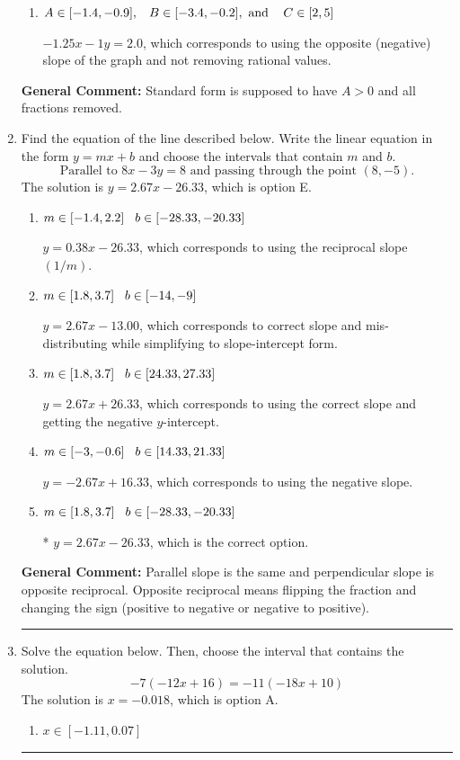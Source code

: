 \documentclass{extbook}[14pt]
\newcommand{\litem}[1]{\item #1

\rule{\textwidth}{0.4pt}}
\begin{document}
\begin{enumerate}
{\begin{enumerate}[label=\Alph*.]
 $5x + 4y = -8$, which corresponds to using the opposite (negative) slope of the graph, but did everything else correctly.
\item \( A \in [-1.4, -0.9], \hspace{3mm} B \in [-3.4, -0.2], \text{ and } \hspace{3mm} C \in [2, 5] \)

 $-1.25x - 1y = 2.0$, which corresponds to using the opposite (negative) slope of the graph and not removing rational values.
\end{enumerate}

\textbf{General Comment:} Standard form is supposed to have $A > 0$ and all fractions removed.
}
\litem{
Find the equation of the line described below. Write the linear equation in the form $ y=mx+b $ and choose the intervals that contain $m$ and $b$.
\[ \text{Parallel to } 8 x - 3 y = 8 \text{ and passing through the point } (8, -5). \]The solution is \( y = 2.67x - 26.33 \), which is option E.\begin{enumerate}[label=\Alph*.]
\item \( m \in [-1.4, 2.2] \hspace*{3mm} b \in [-28.33, -20.33] \)

 $y = 0.38x - 26.33$, which corresponds to using the reciprocal slope $(1/m)$.
\item \( m \in [1.8, 3.7] \hspace*{3mm} b \in [-14, -9] \)

 $y = 2.67x - 13.00$, which corresponds to correct slope and mis-distributing while simplifying to slope-intercept form.
\item \( m \in [1.8, 3.7] \hspace*{3mm} b \in [24.33, 27.33] \)

 $y = 2.67x + 26.33$, which corresponds to using the correct slope and getting the negative $y$-intercept.
\item \( m \in [-3, -0.6] \hspace*{3mm} b \in [14.33, 21.33] \)

 $y = -2.67x + 16.33$, which corresponds to using the negative slope.
\item \( m \in [1.8, 3.7] \hspace*{3mm} b \in [-28.33, -20.33] \)

* $y = 2.67x - 26.33$, which is the correct option.
\end{enumerate}

\textbf{General Comment:} Parallel slope is the same and perpendicular slope is opposite reciprocal. Opposite reciprocal means flipping the fraction and changing the sign (positive to negative or negative to positive).
}
\litem{
Solve the equation below. Then, choose the interval that contains the solution.
\[ -7(-12x + 16) = -11(-18x + 10) \]The solution is \( x = -0.018 \), which is option A.\begin{enumerate}[label=\Alph*.]
\item \( x \in [-1.11, 0.07] \)


\end{enumerate}}
\end{enumerate}
\end{document}

